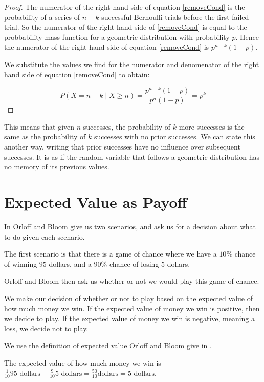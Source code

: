 \documentclass[a4paper,11pt]{article}
\begin{document}
\begin{proof}
The numerator of the right hand side of equation \ref{removeCond} is
the probability of a series of $n+k$ successful Bernoulli trials before
the first failed trial.  So the numerator of the right hand side of
\ref{removeCond} is equal to the probbability mass function for a 
geometric distribution with probability $p$.  Hence the numerator
of the right hand side of equation \ref{removeCond} is 
$p^{n+k} \left( 1 - p \right)$.

We substitute the values we find for the numerator and denomenator of
the right hand side of equation \ref{removeCond} to obtain:

\begin{equation}
P \left( X = n + k \mid X \geq n \right) = 
  \frac
  { 
    p^{n+k} \left( 1 - p \right)
  }
  {
    p^{n}\left( 1 - p \right)
  }
  = p^{k}
\end{equation}

\end{proof}

This means that given $n$ successes, the probability of $k$ more 
successes is the same as the probability of $k$ successes with no
prior successes.  We can state this another way, writing that prior
successes have no influence over subsequent successes.  It is as if
the random variable that follows a geometric distribution has no
memory of its previous values.

\section{Expected Value as Payoff}


In \cite{slides4} Orloff and Bloom give us two scenarios, and ask
us for a decision about what to do given each scenario.

The first scenario is that there is a game of chance where we have a 
$10\%$ chance of winning $95$ dollars, and a $90\%$ chance of losing 
$5$ dollars.

Orloff and Bloom then ask us whether or not we would play this game of
chance.

We make our decision of whether or not to play based on the expected
value of how much money we win.  If the expected value of money we win
is positive, then we decide to play.  If the expected value of money
we win is negative, meaning a loss, we decide not to play.

We use the definition of expected value Orloff and Bloom give in
\cite{reading4b}.

The expected value of how much money we win is $\frac{1}{10} 
95 \text{ dollars} - \frac{9}{10} 5 \text{ dollars}  = 
\frac{50}{10} \text{dollars} = 5 \text{ dollars}$.
\end{document}
